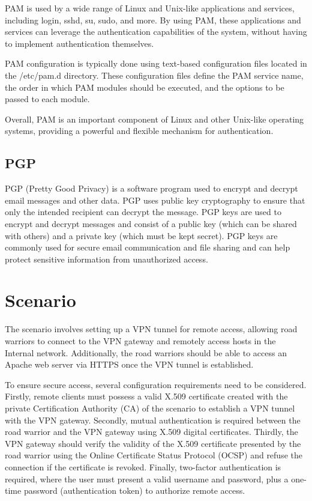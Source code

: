 \documentclass[12pt]{article}
\begin{document}
PAM is used by a wide range of Linux and Unix-like applications and services, including login, sshd, su, sudo, and more. By using PAM, these applications and services can leverage the authentication capabilities of the system, without having to implement authentication themselves.

PAM configuration is typically done using text-based configuration files located in the /etc/pam.d directory. These configuration files define the PAM service name, the order in which PAM modules should be executed, and the options to be passed to each module.

Overall, PAM is an important component of Linux and other Unix-like operating systems, providing a powerful and flexible mechanism for authentication.

\subsection{PGP}
PGP (Pretty Good Privacy) is a software program used to encrypt and decrypt email messages and other data. PGP uses public key cryptography to ensure that only the intended recipient can decrypt the message. PGP keys are used to encrypt and decrypt messages and consist of a public key (which can be shared with others) and a private key (which must be kept secret). PGP keys are commonly used for secure email communication and file sharing and can help protect sensitive information from unauthorized access.

\newpage

\section{Scenario}

The scenario involves setting up a VPN tunnel for remote access, allowing road warriors to connect to the VPN gateway and remotely access hosts in the Internal network. Additionally, the road warriors should be able to access an Apache web server via HTTPS once the VPN tunnel is established.

To ensure secure access, several configuration requirements need to be considered. Firstly, remote clients must possess a valid X.509 certificate created with the private Certification Authority (CA) of the scenario to establish a VPN tunnel with the VPN gateway. Secondly, mutual authentication is required between the road warrior and the VPN gateway using X.509 digital certificates. Thirdly, the VPN gateway should verify the validity of the X.509 certificate presented by the road warrior using the Online Certificate Status Protocol (OCSP) and refuse the connection if the certificate is revoked. Finally, two-factor authentication is required, where the user must present a valid username and password, plus a one-time password (authentication token) to authorize remote access.
\end{document}
